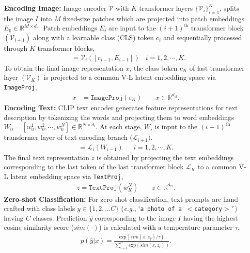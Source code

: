 \documentclass[10pt,twocolumn,letterpaper]{article}
\def\eg{\emph{e.g.}\xspace}
\begin{document}
\noindent \textbf{Encoding Image:}
Image encoder $\mathcal{V}$ with $K$ transformer layers $\{\mathcal{V}_i\}_{i=1}^{K}$, splits the image $I$ into $M$ fixed-size patches which are projected into patch embeddings $E_0 \in \mathbb{R}^{M \times d_v}$.
Patch embeddings $E_i$ are input to the $(i+1)^{\text{th}}$ transformer block $(\mathcal{V}_{i+1})$ along with a learnable class (CLS) token $\text{c}_i$ and sequentially processed through $K$ transformer blocks,
\begin{align*}
[{\text{c}}_i, E_i] &= \mathcal{V}_{i}([\text{c}_{i-1}, E_{i-1}])  ~~~~ i= 1, 2, \cdots, K.
\end{align*}
To obtain the final image representation $x$, the class token $\text{c}_{K}$ of last transformer layer $(\mathcal{V}_{K})$ is projected to a common V-L latent embedding space via \texttt{ImageProj}, 
\begin{align*}
x &= \texttt{ImageProj}({\text{c}}_{K}) \ \ \ \ \ ~~~~ x \in \mathbb{R}^{d_{vl}}.
\end{align*}
\textbf{Encoding Text:} CLIP text encoder generates feature representations for text description by tokenizing the words and projecting them to  word embeddings 
${W}_0 =[w_{0}^{1}, w_{0}^{2}, \cdots, w_{0}^{N}] \in \mathbb{R}^{N \times d_{l}}$.
At each stage, ${W}_i$ is input to the $(i+1)^{\text{th}}$ transformer layer of text encoding branch ($\mathcal{L}_{i+1})$,
\begin{align*}
[{W}_i] = \mathcal{L}_{i}({W}_{i-1}) \ \ \ ~~~~ i= 1, 2, \cdots, K
. \end{align*}
The final text representation $z$ is obtained by projecting the text embeddings corresponding to the last token of the last transformer block $\mathcal{L}_K$ to a common V-L latent embedding space via \texttt{TextProj},
\begin{align*}
z = \texttt{TextProj}({w_{K}^{N}}) \ \ \ \ \ ~~~~ z \in \mathbb{R}^{d_{vl}}.
\end{align*} 
\textbf{Zero-shot Classification:}
For zero-shot classification, text prompts are hand-crafted with class labels $y\in \{1,2,\ldots C\}$ (\eg, ‘\texttt{a photo of a $<$category$>$’}) having $C$ classes. Prediction $\hat{y}$ corresponding to the image $I$ having the highest cosine similarity score ($sim(\cdot)$) is calculated with a temperature parameter $\tau$,
\begin{align*}
p(\hat{y}|x) = \frac{\text{exp}(sim(x, z_{\hat{y}})/\tau)}{\sum_{i=1}^{C}\text{exp}(sim(x, z_{i}))}.
\end{align*}
% 
\end{document}
